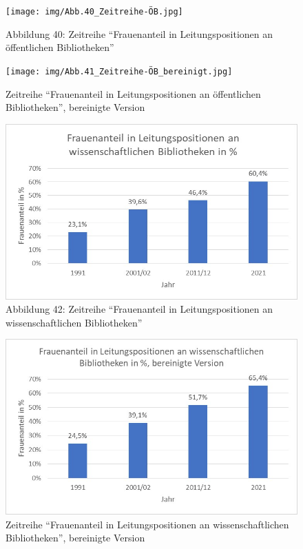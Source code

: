 \documentclass[a4paper,
fontsize=11pt,
oneside,
numbers=noperiodatend,
parskip=half-,
bibliography=totoc,
final
]{scrartcl}
\begin{document}
\begin{figure}
\centering
\texttt{[image: img/Abb.40\_Zeitreihe-ÖB.jpg]}
\caption{Abbildung 40: Zeitreihe \enquote{Frauenanteil in
Leitungspositionen an öffentlichen Bibliotheken}}
\end{figure}

\begin{figure}
\centering
\texttt{[image: img/Abb.41\_Zeitreihe-ÖB\_bereinigt.jpg]}
\caption{Zeitreihe \enquote{Frauenanteil in Leitungspositionen an
öffentlichen Bibliotheken}, bereinigte Version}
\end{figure}

\begin{figure}
\centering
\includegraphics{img/Abb.42_Zeitreihe-WB.jpg}
\caption{Abbildung 42: Zeitreihe \enquote{Frauenanteil in
Leitungspositionen an wissenschaftlichen Bibliotheken}}
\end{figure}

\begin{figure}
\centering
\includegraphics{img/Abb.43_Zeitreihe-WB_bereinigt.jpg}
\caption{Zeitreihe \enquote{Frauenanteil in Leitungspositionen an
wissenschaftlichen Bibliotheken}, bereinigte Version}
\end{figure}
\end{document}
